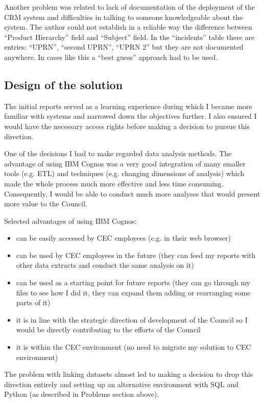 Another problem was related to lack of documentation of the deployment of the CRM system and difficulties in talking to someone knowledgeable about the system. The author could not establish in a reliable way the difference between “Product Hierarchy” field and “Subject” field. In the “incidents” table there are entries: “UPRN”, “second UPRN”, “UPRN 2” but they are not documented anywhere. In cases like this a “best guess” approach had to be used. 
				
		\subsection{Design of the solution}
		
The initial reports served as a learning experience during which I became more familiar with systems and narrowed down the objectives further. I also ensured I would have the necessary access rights before making a decision to pursue this direction.

One of the decisions I had to make regarded data analysis methods. The advantage of using IBM Cognos was a very good integration of many smaller tools (e.g. ETL) and techniques (e.g. changing dimensions of analysis) which made the whole process much more effective and less time consuming. Consequently, I would be able to conduct much more analyses that would present more value to the Council.

Selected advantages of using IBM Cognos:
\begin{itemize}
\item can be easily accessed by CEC employees (e.g. in their web browser)
\item can be used by CEC employees in the future (they can feed my reports with other data extracts and conduct the same analysis on it)
\item can be used as a starting point for future reports (they can go through my files to see how I did it, they can expand them adding or rearranging some parts of it)
\item it is in line with the strategic direction of development of the Council so I would be directly contributing to the efforts of the Council
\item it is within the CEC environment (no need to migrate my solution to CEC environment)
\end{itemize}

The problem with linking datasets almost led to making a decision to drop this direction entirely and setting up an alternative environment with SQL and Python (as described in Problems section above).

